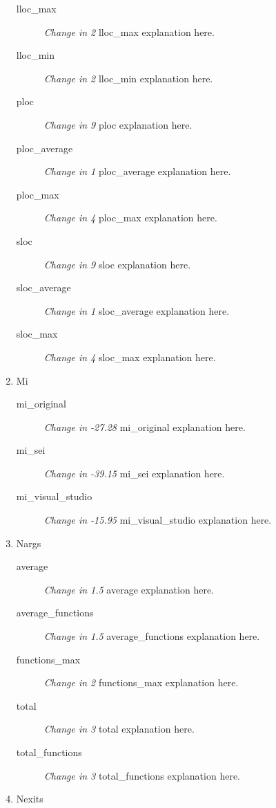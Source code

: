 \begin{enumerate}
\begin{description}
                  \item [lloc\_max] \textit{Change in 2} lloc\_max explanation here.
                  \item [lloc\_min] \textit{Change in 2} lloc\_min explanation here.
                  \item [ploc] \textit{Change in 9} ploc explanation here.
                  \item [ploc\_average] \textit{Change in 1} ploc\_average explanation here.
                  \item [ploc\_max] \textit{Change in 4} ploc\_max explanation here.
                  \item [sloc] \textit{Change in 9} sloc explanation here.
                  \item [sloc\_average] \textit{Change in 1} sloc\_average explanation here.
                  \item [sloc\_max] \textit{Change in 4} sloc\_max explanation here.
            \end{description}
      \item Mi
            \begin{description}
                  \item [mi\_original] \textit{Change in -27.28} mi\_original explanation here.
                  \item [mi\_sei] \textit{Change in -39.15} mi\_sei explanation here.
                  \item [mi\_visual\_studio] \textit{Change in -15.95} mi\_visual\_studio explanation here.
            \end{description}
      \item Nargs
            \begin{description}
                  \item [average] \textit{Change in 1.5} average explanation here.
                  \item [average\_functions] \textit{Change in 1.5} average\_functions explanation here.
                  \item [functions\_max] \textit{Change in 2} functions\_max explanation here.
                  \item [total] \textit{Change in 3} total explanation here.
                  \item [total\_functions] \textit{Change in 3} total\_functions explanation here.
            \end{description}
      \item Nexits
            \begin{description}

\end{description}
\end{enumerate}

